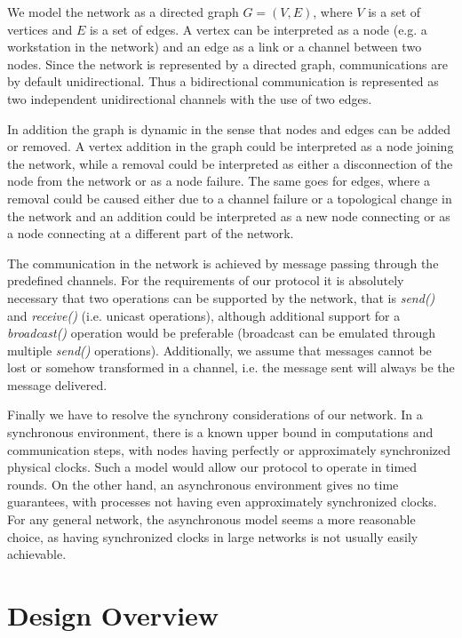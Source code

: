\documentclass[MSc]{icldt}
\begin{document}
We model the network as a directed graph $G = (V,E)$, where $V$ is a set of vertices and $E$ is a set of edges. A vertex can be interpreted as a node (e.g. a workstation in the network) and an edge as a link or a channel between two nodes. Since the network is represented by a directed graph, communications are by default unidirectional. Thus a bidirectional communication is represented as two independent unidirectional channels with the use of two edges. 

In addition the graph is dynamic in the sense that nodes and edges can be added or removed. A vertex addition in the graph could be interpreted as a node joining the network, while a removal could be interpreted as either a disconnection of the node from the network or as a node failure. The same goes for edges, where a removal could be caused either due to a channel failure or a topological change in the network and an addition could be interpreted as a new node connecting or as a node connecting at a different part of the network.

The communication in the network is achieved by message passing through the predefined channels. For the requirements of our protocol it is absolutely necessary that two operations can be supported by the network, that is \textit{send()} and \textit{receive()} (i.e. unicast operations), although additional support for a \textit{broadcast()} operation would be preferable (broadcast can be emulated through multiple \textit{send()} operations). Additionally, we assume that messages cannot be lost or somehow transformed in a channel, i.e. the message sent will always be the message delivered.

Finally we have to resolve the synchrony considerations of our network. In a synchronous environment, there is a known upper bound in computations and communication steps, with nodes having perfectly or approximately synchronized physical clocks. Such a model would allow our protocol to operate in timed rounds. On the other hand, an asynchronous environment gives no time guarantees, with processes not having even approximately synchronized clocks. For any general network, the asynchronous model seems a more reasonable choice, as having synchronized clocks in large networks is not usually easily achievable.

\section{Design Overview}
\end{document}
